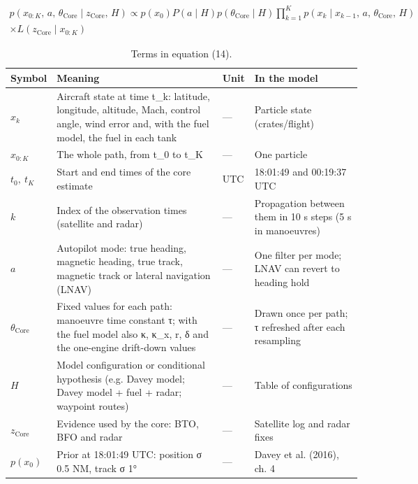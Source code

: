 \setcounter{equation}{13}

\begin{multline}
p\left(x_{0:K},\, a,\, \theta_{\mathrm{Core}} \mid z_{\mathrm{Core}},\, H\right) \propto p\left(x_{0}\right) P\left(a \mid H\right) p\left(\theta_{\mathrm{Core}} \mid H\right) \prod_{k=1}^{K} p\left(x_{k} \mid x_{k-1},\, a,\, \theta_{\mathrm{Core}},\, H\right)\\ \times L\left(z_{\mathrm{Core}} \mid x_{0:K}\right)
\label{eq:14}
\end{multline}
\begin{table}[h]
\caption{Terms in equation (14).}
\small
\begin{tabular}{p{2.4cm}p{4.6cm}p{1.1cm}p{4.0cm}}
\hline
Symbol & Meaning & Unit & In the model \\
\hline
$x_{k}$ & Aircraft state at time t\_k: latitude, longitude, altitude, Mach, control angle, wind error and, with the fuel model, the fuel in each tank & — & Particle state (crates/flight) \\
$x_{0:K}$ & The whole path, from t\_0 to t\_K & — & One particle \\
$t_{0},\ t_{K}$ & Start and end times of the core estimate & UTC & 18:01:49 and 00:19:37 UTC \\
$k$ & Index of the observation times (satellite and radar) & — & Propagation between them in 10 s steps (5 s in manoeuvres) \\
$a$ & Autopilot mode: true heading, magnetic heading, true track, magnetic track or lateral navigation (LNAV) & — & One filter per mode; LNAV can revert to heading hold \\
$\theta_{\mathrm{Core}}$ & Fixed values for each path: manoeuvre time constant τ; with the fuel model also κ, κ\_x, r, δ and the one-engine drift-down values & — & Drawn once per path; τ refreshed after each resampling \\
$H$ & Model configuration or conditional hypothesis (e.g. Davey model; Davey model + fuel + radar; waypoint routes) & — & Table of configurations \\
$z_{\mathrm{Core}}$ & Evidence used by the core: BTO, BFO and radar & — & Satellite log and radar fixes \\
$p(x_{0})$ & Prior at 18:01:49 UTC: position σ 0.5 NM, track σ 1° & — & Davey et al. (2016), ch. 4 \\

\end{tabular}
\end{table}
